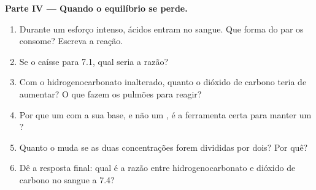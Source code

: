 \begin{problem}
\medskip
\noindent\textbf{Parte IV --- Quando o equilíbrio se perde.}
\begin{enumerate}[resume]
  \item Durante um esforço intenso, ácidos entram no sangue. Que forma do
        par os consome? Escreva a reação.
  \item Se o  caísse para 7.1, qual seria a razão?
  \item Com o hidrogenocarbonato inalterado, quanto o dióxido de carbono
        teria de aumentar? O que fazem os pulmões para reagir?
  \item Por que um  com a sua base, e não um , é a
        ferramenta certa para manter um ?
  \item Quanto o  muda se as duas concentrações forem divididas por
        dois? Por quê?
  \item Dê a resposta final: qual é a razão entre hidrogenocarbonato e
        dióxido de carbono no sangue a  7.4?
\end{enumerate}
\end{problem}
